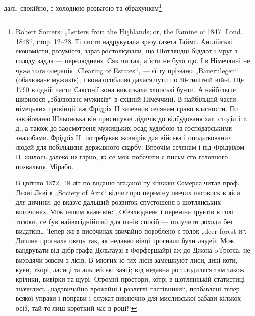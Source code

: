 далі, спокійно, с холодною розвагою та обрахунком\footnote{
Robert Somers: „Letters from the Highlands; or, the Famine of 1847. Lond. 1848“, стор. 12--28. Ті
листи надрукувала зразу ґазета Таймc. Англійські економісти, розумієся, зараз ростолкували, що
Шотляндці бідуют і мрут з голоду задля — перелюдненя. Сяк чи так, а їсти не було що. І в Німеччині
не чужа тота операція „Clearing of Estates“, — єї ту прізвано „Bauernlegen“ (обалюванє мужиків), і
вона особливо далася чути по 30-тилітній війні. Ще 1790 в одній части Саксонії вона викликала хлопські бунти. А найбільше
ширилося „обалюванє мужиків“ в східній Німеччині. В найбільшій части німецьких провінцій аж Фрідріх
II запевнив селянам право власности. По завойованю Шльонська він присилував дідичів до відбудованя
хат, стоділ і т. д., а також до заосмотреня мужицьких осад худобою та ґосподарськими знадобами.
Фрідріх II. потребував жовнірів для війська і оподаткованих людей для побільшеня державного
скарбу. Впрочім селянам і під Фрідріхом II. жилось далеко не гарно, як се мож побачити с письм єго
головного похвальця, Мірабо.

В цвітню 1872, 18 літ по виданю згаданої ту книжки Сомерса читав проф. Лєоні Лєві в „Society of
Arts“ відчит про переміну овечих пасовиск в ліси для дичини, де вказує дальший розвиток спустошеня в
шотлянських височинах. Між їншим каже він: „Обезлюдненє і переміна ґрунтів в голі толоки, се був
найвигіднійший для панів спосіб — получити доходи без видатків\dots{} Тепер же в височинах звичайно
пороблено с толок „deer forest-и“. Дичина прогнала овець так, як недавно вівці прогнали були людей. Мож вандрувати від
дібр ґрафа Дельгаузі в Форфершайрі аж до Джона o’Ґротса, не виходячи зовсім з лісів. В многих іс
тих лісів замешкуют лиси, дикі коти, куни, тхорі, ласиці та альпейські заяці; від недавна
росплодилися там також крілики, вивірки та щурі. Огромні простори, котрі в шотлянській статистиці
значились „надзвичайно врожайні і розляглі пастівники“, позбавлені тепер всякої управи і поправи і служат виключно для мисливської
забави кількох осіб, тай то лиш короткий час в році!“

}
